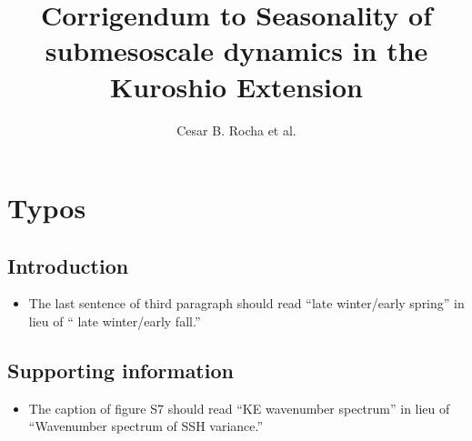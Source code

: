 \documentclass[11pt]{article}
\title{\bf \LARGE Corrigendum to Seasonality of submesoscale dynamics in the Kuroshio Extension}
\author{Cesar B. Rocha et al.}
\date{}
\newcommand{\sZ}{\mathsf{Z}}
\newcommand{\sE}{\mathsf{E}}
\begin{document}


\renewcommand{\sZ}{\mathsf{Z}}
\renewcommand{\sE}{\mathsf{E}}
\newcommand{\iBu}{\left(\tfrac{f_0}{N}\right)^2}
\newcommand{\F}{\mathcal{F}}
\newcommand{\D}{\mathcal{D}}
\renewcommand{\P}{\mathcal{P}}
\newcommand{\dU}{\delta U}
\newcommand{\W}{\mathcal{W}}
\newcommand{\cK}{\mathcal{K}}
\newcommand{\cP}{\mathcal{P}}
\renewcommand{\L}{\mathsf{L}}

%
%

\maketitle

\section*{Typos}

\subsection*{Introduction}
    \begin{itemize}
        \item{The last sentence of third paragraph should read ``late winter/early spring'' in lieu of ``              late winter/early fall.''}
    \end{itemize}
    
\subsection*{Supporting information}
    \begin{itemize}
        \item{The caption of figure S7 should read ``KE wavenumber spectrum'' in lieu of ``Wavenumber spectrum of SSH variance.''}
    \end{itemize}

%
%
%
%
\end{document}
